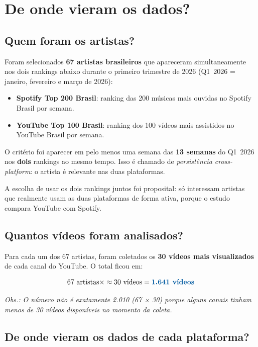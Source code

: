 \documentclass[12pt,a4paper]{article}
\newcommand{\num}[1]{\textcolor{azul}{\textbf{#1}}}
\newcommand{\term}[1]{\textcolor{roxo}{\textit{#1}}}
\newcommand{\obs}[1]{\par\small\textcolor{cinza}{\textit{Obs.: #1}}\normalsize\par}
\begin{document}
\section{De onde vieram os dados?}

\subsection{Quem foram os artistas?}

Foram selecionados \num{67 artistas brasileiros} que apareceram simultaneamente
nos dois rankings abaixo durante o primeiro trimestre de 2026 (Q1~2026 =
janeiro, fevereiro e março de 2026):

\begin{itemize}
  \item \textbf{Spotify Top 200 Brasil}: ranking das 200 músicas mais ouvidas
        no Spotify Brasil por semana.
  \item \textbf{YouTube Top 100 Brasil}: ranking dos 100 vídeos mais assistidos
        no YouTube Brasil por semana.
\end{itemize}

O critério foi aparecer em pelo menos uma semana das \num{13 semanas} do
Q1~2026 nos \textbf{dois} rankings ao mesmo tempo. Isso é chamado de
\term{persistência cross-platform}: o artista é relevante nas duas plataformas.

A escolha de usar os dois rankings juntos foi proposital: só interessam
artistas que realmente usam as duas plataformas de forma ativa, porque o
estudo compara YouTube com Spotify.

\subsection{Quantos vídeos foram analisados?}

Para cada um dos 67 artistas, foram coletados os \num{30 vídeos mais
visualizados} de cada canal do YouTube. O total ficou em:

\[
  67 \text{ artistas} \times \approx 30 \text{ vídeos} = \num{1.641 vídeos}
\]

\obs{O número não é exatamente 2.010 (67 × 30) porque alguns canais tinham
menos de 30 vídeos disponíveis no momento da coleta.}

\subsection{De onde vieram os dados de cada plataforma?}
\end{document}
